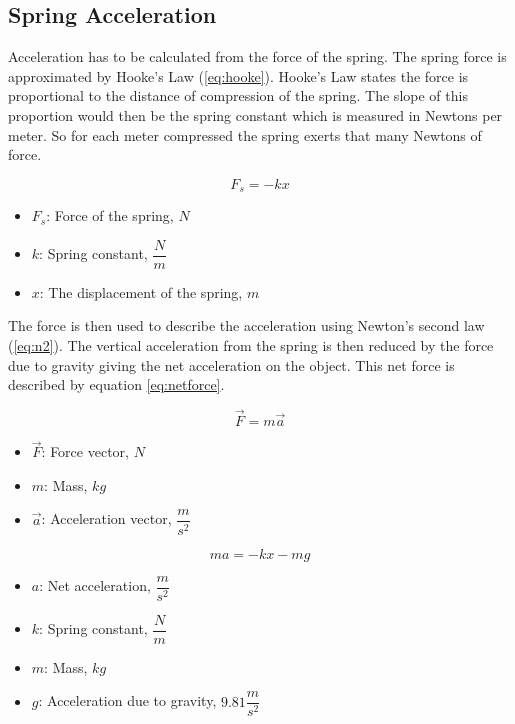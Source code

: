 \documentclass[12pt, letterpaper]{article}
\newcommand{\poses}[1]{#1's}
\begin{document}
\subsection{Spring Acceleration} \label{sec:SpringAcc}
Acceleration has to be calculated from the force of the spring. The spring force is approximated by Hooke's
Law (\ref{eq:hooke}). Hooke's Law states the force is proportional to the distance of compression of the
spring. The slope of this proportion would then be the spring constant which is measured in Newtons per
meter. So for each meter compressed the spring exerts that many Newtons of force. 

\begin{singlespace}
  \begin{equation}
    \label{eq:hooke}
    F_s = -kx
  \end{equation}
  \begin{small}
    \begin{itemize}[label=]
      \item $F_s$: Force of the spring, $N$
      \item $k$: Spring constant, $\dfrac{N}{m}$
      \item $x$: The displacement of the spring, $m$
    \end{itemize}
  \end{small}
\end{singlespace}

The force is then used to describe the acceleration using \poses{Newton} second law (\ref{eq:n2}). The
vertical acceleration from the spring is then reduced by the force due to gravity giving the net acceleration
on the object. This net force is described by equation \ref{eq:netforce}.

\begin{singlespace}
  \begin{equation}
    \label{eq:n2}
    \vec{F} = m \vec{a}
  \end{equation}
  \begin{small}
    \begin{itemize}[label=]
      \item $\vec{F}$: Force vector, $N$
      \item $m$: Mass, $kg$
      \item $\vec{a}$: Acceleration vector, $\dfrac{m}{s^2}$
    \end{itemize}
  \end{small}
  \begin{equation}
    \label{eq:netforce}
    m a = -k x - m g
  \end{equation}
  \begin{small}
    \begin{itemize}[label=]
      \item $a$: Net acceleration, $\dfrac{m}{s^2}$
      \item $k$: Spring constant, $\dfrac{N}{m}$
      \item $m$: Mass, $kg$
      \item $g$: Acceleration due to gravity, $9.81 \dfrac{m}{s^2}$
    \end{itemize}
  \end{small}
\end{singlespace}
\end{document}
